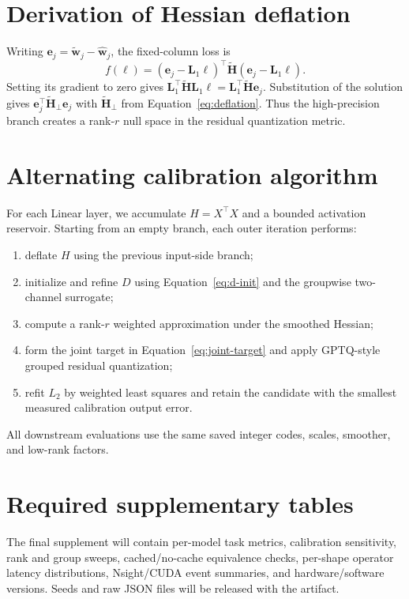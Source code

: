 \documentclass{article}
\newcommand{\Hess}{\bm{H}}
\newcommand{\Lo}{\bm{L}_1}
\begin{document}



\appendix
\section{Derivation of Hessian deflation}

Writing $\bm e_j=\widetilde{\bm w}_j-\widehat{\bm w}_j$, the fixed-column loss
is
\[
f(\bm\ell)=(\bm e_j-\Lo\bm\ell)^\top
\widetilde{\Hess}(\bm e_j-\Lo\bm\ell).
\]
Setting its gradient to zero gives
$\Lo^\top\widetilde{\Hess}\Lo\bm\ell=
\Lo^\top\widetilde{\Hess}\bm e_j$. Substitution of the solution gives
$\bm e_j^\top\widetilde{\Hess}_\perp\bm e_j$ with
$\widetilde{\Hess}_\perp$ from Equation~\ref{eq:deflation}. Thus the
high-precision branch creates a rank-$r$ null space in the residual
quantization metric.

\section{Alternating calibration algorithm}

For each Linear layer, we accumulate $H=X^\top X$ and a bounded activation
reservoir. Starting from an empty branch, each outer iteration performs:
\begin{enumerate}
    \item deflate $H$ using the previous input-side branch;
    \item initialize and refine $D$ using Equation~\ref{eq:d-init} and the
    groupwise two-channel surrogate;
    \item compute a rank-$r$ weighted approximation under the smoothed Hessian;
    \item form the joint target in Equation~\ref{eq:joint-target} and apply
    GPTQ-style grouped residual quantization;
    \item refit $L_2$ by weighted least squares and retain the candidate with
    the smallest measured calibration output error.
\end{enumerate}
All downstream evaluations use the same saved integer codes, scales, smoother,
and low-rank factors.

\section{Required supplementary tables}

The final supplement will contain per-model task metrics, calibration
sensitivity, rank and group sweeps, cached/no-cache equivalence checks,
per-shape operator latency distributions, Nsight/CUDA event summaries, and
hardware/software versions. Seeds and raw JSON files will be released with the
artifact.
\end{document}
